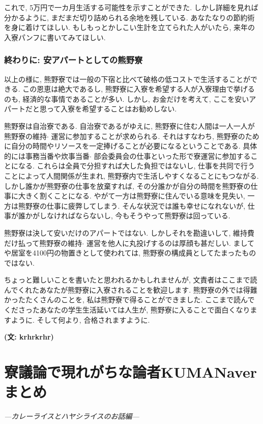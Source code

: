 \documentclass[10pt,b5jsbook,dvips,dvipdfmx,openany]{jsbook}
\theoremstyle{definition}
\begin{document}
	これで, 5万円で一カ月生活する可能性を示すことができた. しかし詳細を見れば分かるように, まだまだ切り詰められる余地を残している. あなたなりの節約術を身に着けてほしい. もしもっとかしこい生計を立てられた人がいたら, 来年の入寮パンフに書いてみてほしい.

			\subsubsection{終わりに: 安アパートとしての熊野寮}
			以上の様に, 熊野寮では一般の下宿と比べて破格の低コストで生活することができる. この恩恵は絶大であるし, 熊野寮に入寮を希望する人が入寮理由で挙げるのも, 経済的な事情であることが多い. しかし, お金だけを考えて, ここを安いアパートだと思って入寮を希望することはお勧めしない.

		熊野寮は自治寮である. 自治寮であるがゆえに, 熊野寮に住む人間は一人一人が熊野寮の維持$ \cdot $ 運営に参加することが求められる. それはすなわち, 熊野寮のために自分の時間やリソースを一定捧げることが必要になるということである. 具体的には事務当番や炊事当番$ \cdot $ 部会委員会の仕事といった形で寮運営に参加することになる. これらは全員で分担すれば大した負担ではないし, 仕事を共同で行うことによって人間関係が生まれ, 熊野寮内で生活しやすくなることにもつながる. しかし誰かが熊野寮の仕事を放棄すれば, その分誰かが自分の時間を熊野寮の仕事に大きく割くことになる. やがて一方は熊野寮に住んでいる意味を見失い, 一方は熊野寮の仕事に疲弊してしまう. そんな状況では誰も幸せになれないが, 仕事が誰かがしなければならないし, 今もそうやって熊野寮は回っている.

		熊野寮は決して安いだけのアパートではない. しかしそれを勘違いして, 維持費だけ払って熊野寮の維持$ \cdot $ 運営を他人に丸投げするのは厚顔も甚だしい. ましてや居室を4100円の物置きとして使われては, 熊野寮の構成員としてたまったものではない.

		ちょっと難しいことを書いたと思われるかもしれませんが, 文責者はここまで読んでくれたあなたが熊野寮に入寮されることを歓迎します. 熊野寮の外では得難かったたくさんのことを, 私は熊野寮で得ることができました. ここまで読んでくださったあなたの学生生活延いては人生が, 熊野寮に入ることで面白くなりますように. そして何より, 合格されますように.

		{\bf (文: krhrkrhr)}




	\section{寮議論で現れがちな論者KUMANaverまとめ} %
	\emph{---カレーライスとハヤシライスのお話編---}
\end{document}
